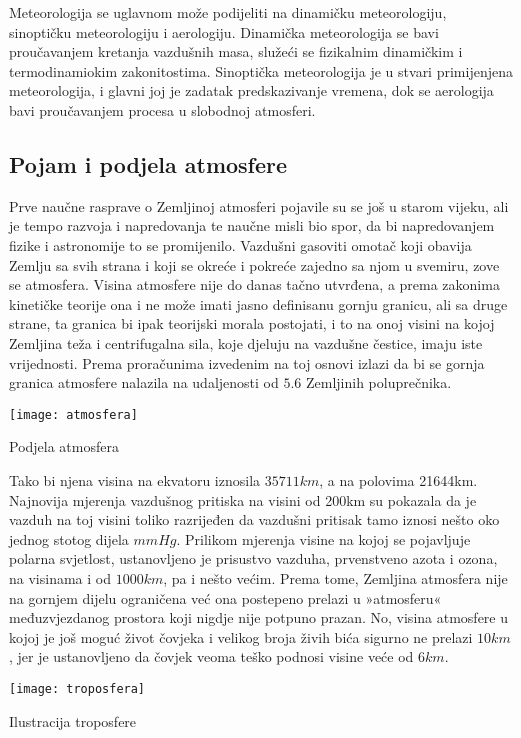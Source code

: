 Meteorologija se uglavnom može podijeliti na dinamičku meteorologiju, sinoptičku meteorologiju i aerologiju. Dinamička  meteorologija se bavi proučavanjem  kretanja vazdušnih masa, služeći  se fizikalnim dinamičkim i termodinamiokim zakonitostima. Sinoptička meteorologija je u stvari primijenjena meteorologija, i glavni  joj je  zadatak predskazivanje vremena, dok se aerologija bavi proučavanjem procesa u slobodnoj atmosferi. 
\subsection{Pojam i podjela atmosfere}
Prve naučne rasprave o Zemljinoj atmosferi pojavile su se još u starom vijeku, ali je tempo razvoja i napredovanja te naučne misli bio spor, da bi napredovanjem fizike i astronomije to se promijenilo. 
Vazdušni gasoviti omotač koji obavija Zemlju sa svih strana i koji se okreće i pokreće zajedno sa njom u svemiru, zove se atmosfera. Visina atmosfere nije do danas tačno utvrđena, a prema zakonima kinetičke teorije ona i ne može imati jasno definisanu gornju granicu, ali sa druge strane, ta granica bi ipak teorijski morala postojati, i to na onoj visini na kojoj Zemljina teža i centrifugalna sila, koje djeluju na vazdušne čestice, imaju iste vrijednosti. Prema proračunima izvedenim na toj osnovi izlazi da bi se gornja granica atmosfere nalazila na udaljenosti od $5.6$  Zemljinih poluprečnika. 
	\begin{marginfigure}%
		\texttt{[image: atmosfera]}
		\caption{Podjela atmosfera}
		\label{fig:atmosfera}
	\end{marginfigure}
Tako bi njena visina na ekvatoru iznosila $35711km$, a na polovima 21644km. Najnovija mjerenja vazdušnog pritiska na visini od 200km su pokazala da je vazduh na toj visini toliko razrijeđen da vazdušni pritisak tamo iznosi nešto oko jednog stotog dijela $mm Hg$. Prilikom mjerenja visine na kojoj se pojavljuje polarna svjetlost, ustanovljeno je prisustvo vazduha, prvenstveno azota i ozona, na visinama i od $1000km$, pa i nešto većim. Prema tome, Zemljina atmosfera nije na gornjem dijelu ograničena već ona postepeno prelazi u »atmosferu« međuzvjezdanog prostora koji nigdje nije potpuno prazan. No, visina atmosfere u kojoj je još moguć život čovjeka i velikog broja živih bića sigurno ne prelazi $10km$, jer je ustanovljeno da čovjek veoma teško podnosi visine veće od $6km$.
		\begin{marginfigure}%
		\texttt{[image: troposfera]}
		\caption{Ilustracija troposfere}
		\label{fig:troposfera}
		\end{marginfigure} 
